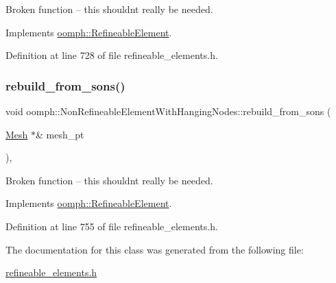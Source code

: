 Broken function -- this shouldn\textquotesingle{}t really be needed. 



Implements \hyperlink{classoomph_1_1RefineableElement_ada6f0efe831ffefb1d2829ce01d45bfc}{oomph\+::\+Refineable\+Element}.



Definition at line 728 of file refineable\+\_\+elements.\+h.

\mbox{\label{classoomph_1_1NonRefineableElementWithHangingNodes_a702ff8da8744c6fc139c25fa83f4605c}} 
\subsubsection{\texorpdfstring{rebuild\+\_\+from\+\_\+sons()}{rebuild\_from\_sons()}}
{\footnotesize\ttfamily void oomph\+::\+Non\+Refineable\+Element\+With\+Hanging\+Nodes\+::rebuild\+\_\+from\+\_\+sons (\begin{DoxyParamCaption}\item[{\hyperlink{classoomph_1_1Mesh}{Mesh} $\ast$\&}]{mesh\+\_\+pt }\end{DoxyParamCaption})\hspace{0.3cm}{\ttfamily [inline]}, {\ttfamily [virtual]}}



Broken function -- this shouldn\textquotesingle{}t really be needed. 



Implements \hyperlink{classoomph_1_1RefineableElement_a33324be27833fa4b78279d17158215fa}{oomph\+::\+Refineable\+Element}.



Definition at line 755 of file refineable\+\_\+elements.\+h.



The documentation for this class was generated from the following file\+:\begin{DoxyCompactItemize}
\item 
\hyperlink{refineable__elements_8h}{refineable\+\_\+elements.\+h}\end{DoxyCompactItemize}
